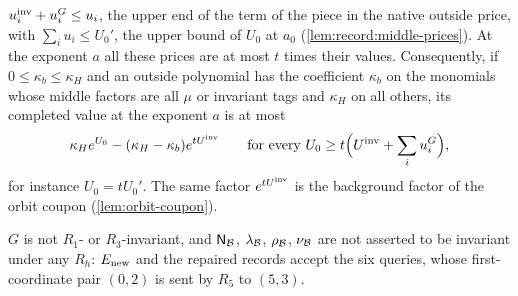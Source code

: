 \begin{lemma}
\begin{enumerate}[label=(\roman*)]
 $u^{\rm inv}_i+u^G_i\le u_i$, the upper end of the term of the piece in the native
 outside price, with $\sum_iu_i\le U_0'$, the upper bound of $U_0$ at $a_0$
 (\cref{lem:record:middle-prices}). At the exponent $a$ all these prices are at
 most $t$ times their values. Consequently, if $0\le\kappa_b\le\kappa_H$ and an outside
 polynomial has the coefficient $\kappa_b$ on the monomials whose middle factors are
 all $\mu$ or invariant tags and $\kappa_H$ on all others, its completed value at the
 exponent $a$ is at most
 \[
  \kappa_He^{U_0}-(\kappa_H-\kappa_b)e^{tU^{\mathrm{inv}}}
  \qquad\text{for every }U_0\ge t\Bigl(U^{\mathrm{inv}}+\sum_iu^G_i\Bigr),
 \]
 for instance $U_0=tU_0'$. The same factor $e^{tU^{\mathrm{inv}}}$ is the background factor of the
 orbit coupon (\cref{lem:orbit-coupon}).
\end{enumerate}
$G$ is not $R_1$- or $R_3$-invariant, and $\mathsf N_\mathcal B$, $\lambda_\mathcal B$, $\rho_\mathcal B$,
$\nu_\mathcal B$ are not asserted to be invariant under any $R_h$: $E_{\rm new}$ and the
repaired records accept the six queries, whose first-coordinate pair $(0,2)$ is
sent by $R_5$ to $(5,3)$.
\end{lemma}

